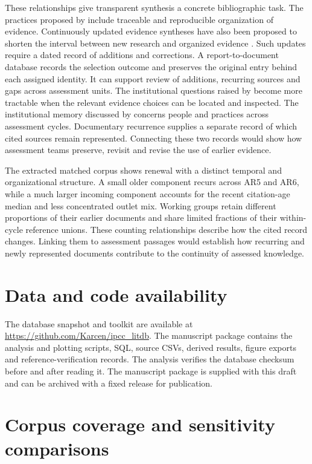 \documentclass[11pt,a4paper]{article}
\begin{document}
These relationships give transparent synthesis a concrete bibliographic task. The practices proposed by \citet{ford2025syntheses} include traceable and reproducible organization of evidence. Continuously updated evidence syntheses have also been proposed to shorten the interval between new research and organized evidence \citep{elliott2021living}. Such updates require a dated record of additions and corrections. A report-to-document database records the selection outcome and preserves the original entry behind each assigned identity. It can support review of additions, recurring sources and gaps across assessment units. The institutional questions raised by \citet{asayama2023pathways,mochizuki2023reflexivity} become more tractable when the relevant evidence choices can be located and inspected. The institutional memory discussed by \citet{slade2024lessons} concerns people and practices across assessment cycles. Documentary recurrence supplies a separate record of which cited sources remain represented. Connecting these two records would show how assessment teams preserve, revisit and revise the use of earlier evidence.

The extracted matched corpus shows renewal with a distinct temporal and organizational structure. A small older component recurs across AR5 and AR6, while a much larger incoming component accounts for the recent citation-age median and less concentrated outlet mix. Working groups retain different proportions of their earlier documents and share limited fractions of their within-cycle reference unions. These counting relationships describe how the cited record changes. Linking them to assessment passages would establish how recurring and newly represented documents contribute to the continuity of assessed knowledge.

\section*{Data and code availability}
The database snapshot and toolkit are available at \url{https://github.com/Karcen/ipcc_litdb}. The manuscript package contains the analysis and plotting scripts, SQL, source CSVs, derived results, figure exports and reference-verification records. The analysis verifies the database checksum before and after reading it. The manuscript package is supplied with this draft and can be archived with a fixed release for publication.



\clearpage
\appendix
\section{Corpus coverage and sensitivity comparisons}
\end{document}

